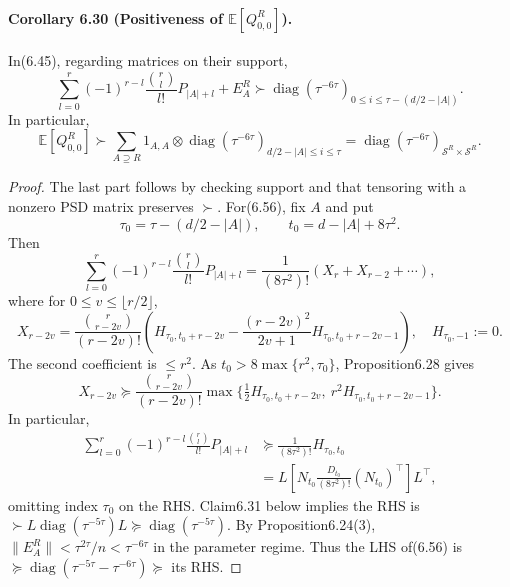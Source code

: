 \documentclass[10pt,a4paper]{article}
\begin{document}
\paragraph{Corollary 6.30 (Positiveness of $\mathbb E[Q_{0,0}^R]$).} In(6.45), regarding matrices on their support,
\[\sum_{l=0}^r(-1)^{r-l}\frac{\binom rl}{l!}P_{|A|+l}+E_A^R\succ\operatorname{diag}(\tau^{-6\tau})_{0\le i\le\tau-(d/2-|A|)}.\tag{6.56}\]
In particular,
\[\mathbb E[Q_{0,0}^R]\succ\sum_{A\supseteq R}1_{A,A}\otimes\operatorname{diag}(\tau^{-6\tau})_{d/2-|A|\le i\le\tau}=\operatorname{diag}(\tau^{-6\tau})_{\mathcal S^R\times\mathcal S^R}.\tag{6.57}\]
\begin{proof}The last part follows by checking support and that tensoring with a nonzero PSD matrix preserves $\succ$. For(6.56), fix $A$ and put
\[\tau_0=\tau-(d/2-|A|),\qquad t_0=d-|A|+8\tau^2.\tag{6.58}\]
Then
\[\sum_{l=0}^r(-1)^{r-l}\frac{\binom rl}{l!}P_{|A|+l}=\frac1{(8\tau^2)!}(X_r+X_{r-2}+\cdots),\tag{6.59}\]
where for $0\le v\le\lfloor r/2\rfloor$,
\[X_{r-2v}=\frac{\binom r{r-2v}}{(r-2v)!}\left(H_{\tau_0,t_0+r-2v}-\frac{(r-2v)^2}{2v+1}H_{\tau_0,t_0+r-2v-1}\right),\quad H_{\tau_0,-1}:=0.\]
The second coefficient is $\le r^2$. As $t_0>8\max\{r^2,\tau_0\}$, Proposition6.28 gives
\[X_{r-2v}\succeq\frac{\binom r{r-2v}}{(r-2v)!}\max\{\tfrac12H_{\tau_0,t_0+r-2v},\ r^2H_{\tau_0,t_0+r-2v-1}\}.\]
In particular,
\begin{align*}\sum_{l=0}^r(-1)^{r-l}\frac{\binom rl}{l!}P_{|A|+l}&\succeq\frac1{(8\tau^2)!}H_{\tau_0,t_0}\\&=L[N_{t_0}\tfrac{D_{t_0}}{(8\tau^2)!}(N_{t_0})^\top]L^\top,\tag{6.60}\end{align*}
omitting index $\tau_0$ on the RHS. Claim6.31 below implies the RHS is $\succ L\operatorname{diag}(\tau^{-5\tau})L\succeq\operatorname{diag}(\tau^{-5\tau})$. By Proposition6.24(3), $\|E_A^R\|<\tau^{2\tau}/n<\tau^{-6\tau}$ in the parameter regime. Thus the LHS of(6.56) is $\succeq\operatorname{diag}(\tau^{-5\tau}-\tau^{-6\tau})\succeq$ its RHS.\end{proof}
\end{document}
